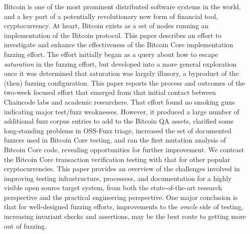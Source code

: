 Bitcoin is one of the most prominent distributed software systems in the world, and a key part of a potentially revolutionary new form of financial tool, cryptocurrency.  At heart, Bitcoin exists as a set of nodes running an implementation of the Bitcoin protocol.  This paper describes an effort to investigate and enhance the effectiveness of the Bitcoin Core implementation fuzzing effort.  The effort initially began as a query about how to escape \emph{saturation} in the fuzzing effort, but developed into a more general exploration once it was determined that saturation was largely illusory, a byproduct of the (then) fuzzing configuration.  This paper reports the process and outcomes of the two-week focused effort that emerged from that initial contact between Chaincode labs and academic researchers.  That effort found no smoking guns indicating major test/fuzz weaknesses. However, it produced a large number of additional fuzz corpus entries to add to the Bitcoin QA assets, clarified some long-standing problems in OSS-Fuzz triage, increased the set of documented fuzzers used in Bitcoin Core testing, and ran the first mutation analysis of Bitcoin Core code, revealing opportunities for further improvement.  We contrast the Bitcoin Core transaction verification testing with that for other popular cryptocurrencies.  This paper provides an overview of the challenges involved in improving testing infrastructure, processess, and documentation for a highly visible open source target system, from both the state-of-the-art research perspective and the practical engineering perspective.  One major conclusion is that for well-designed fuzzing efforts, improvements to the \emph{oracle} side of testing, increasing invariant checks and assertions, may be the best route to getting more out of fuzzing.